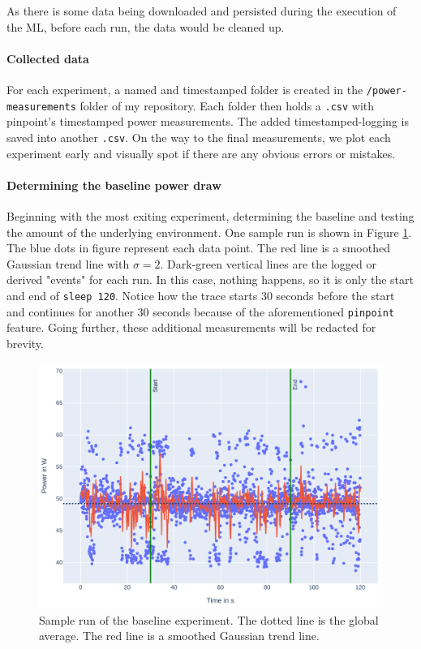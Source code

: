 As there is some data being downloaded and persisted during the execution of the ML, before each run, the data would be cleaned up.

\paragraph{Collected data}

For each experiment, a named and timestamped folder is created in the \verb|/power-measurements| folder of my repository. Each folder then holds a \verb|.csv| with pinpoint's timestamped power measurements. 
The added timestamped-logging is saved into another \verb|.csv|. 
On the way to the final measurements, we plot each experiment early and visually spot if there are any obvious errors or mistakes.

\paragraph{Determining the baseline power draw}

Beginning with the most exiting experiment, determining the baseline and testing the amount of the underlying environment. 
One sample run is shown in Figure \ref{fig:plot_baseline}.
The blue dots in figure represent each data point. The red line is a smoothed Gaussian trend line with $\sigma = 2$. 
Dark-green vertical lines are the logged or derived "events" for each run. In this case, nothing happens, so it is only the start and end of \verb|sleep 120|. 
Notice how the trace starts 30 seconds before the start and continues for another 30 seconds because of the aforementioned \verb|pinpoint| feature.
Going further, these additional measurements will be redacted for brevity.

\begin{figure}
    \includegraphics[width=\linewidth]{power-measurements/measurements_sleep_0714004033/plot.pdf}
    \caption{Sample run of the baseline experiment. The dotted line is the global average. The red line is a smoothed Gaussian trend line.}
    \label{fig:plot_baseline}
\end{figure}

